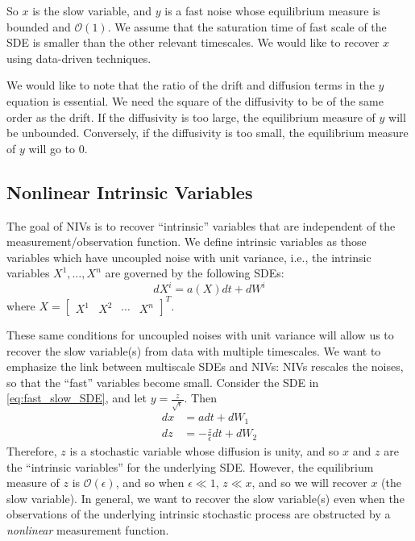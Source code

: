 \documentclass[1p]{elsarticle}
\begin{document}
So $x$ is the slow variable, and $y$ is a fast noise whose equilibrium measure is bounded and $\mathcal{O}(1)$.
%
We assume that the saturation time of fast scale  of the SDE is smaller than the other relevant timescales.
%
We would like to recover $x$ using data-driven techniques.

We would like to note that the ratio of the drift and diffusion terms in the $y$ equation is essential.
%
We need the square of the diffusivity to be of the same order as the drift.
%
If the diffusivity is too large, the equilibrium measure of $y$ will be unbounded.
%
Conversely, if the diffusivity is too small, the equilibrium measure of $y$ will go to 0.


\subsection{Nonlinear Intrinsic Variables}

The goal of NIVs is to recover ``intrinsic'' variables that are independent of the measurement/observation function.
%
We define intrinsic variables as those variables which have uncoupled noise with unit variance,
i.e., the intrinsic variables $X^1, \dots, X^n$ are governed by the following SDEs:
\begin{equation} \label{eq:NIV_formulation}
dX^i = a(X) dt + dW^i
\end{equation}
where $X = \begin{bmatrix} X^1 & X^2 & \cdots & X^n \end{bmatrix}^T$.

These same conditions for uncoupled noises with unit variance will allow us to recover the slow variable(s) from data with multiple timescales. 
%
We want to emphasize the link between multiscale SDEs and NIVs: NIVs rescales the noises, so that the ``fast'' variables become small.
%
Consider the SDE in \eqref{eq:fast_slow_SDE}, and let $y = \frac{z}{\sqrt{\epsilon}}$. 
%
Then
\begin{equation}
\begin{aligned}
dx &= adt + dW_1\\
dz &= -\frac{z}{\epsilon} dt +  dW_2
\end{aligned}
\end{equation}
%
Therefore, $z$ is a stochastic variable whose diffusion is unity, and so $x$ and $z$ are the ``intrinsic variables'' for the underlying SDE.
%
However, the equilibrium measure of $z$ is $\mathcal{O}(\epsilon)$, and so when $\epsilon \ll 1$, $z \ll x$, and so we will recover $x$ (the slow variable). 
%
In general, we want to recover the slow variable(s) even when the observations of the underlying intrinsic stochastic process are obstructed by a {\em nonlinear} measurement function. 
\end{document}
